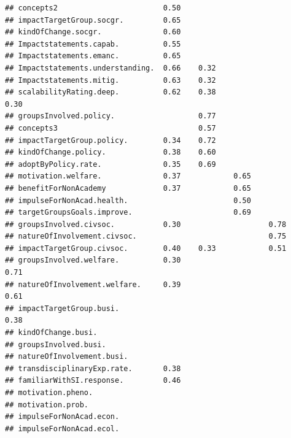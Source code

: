 \documentclass[
]{article}
\begin{document}
\begin{verbatim}
## concepts2                        0.50                                          
## impactTargetGroup.socgr.         0.65                                          
## kindOfChange.socgr.              0.60                                          
## Impactstatements.capab.          0.55                                          
## Impactstatements.emanc.          0.65                                          
## Impactstatements.understanding.  0.66    0.32                                  
## Impactstatements.mitig.          0.63    0.32                                  
## scalabilityRating.deep.          0.62    0.38                            0.30  
## groupsInvolved.policy.                   0.77                                  
## concepts3                                0.57                                  
## impactTargetGroup.policy.        0.34    0.72                                  
## kindOfChange.policy.             0.38    0.60                                  
## adoptByPolicy.rate.              0.35    0.69                                  
## motivation.welfare.              0.37            0.65                          
## benefitForNonAcademy             0.37            0.65                          
## impulseForNonAcad.health.                        0.50                          
## targetGroupsGoals.improve.                       0.69                          
## groupsInvolved.civsoc.           0.30                    0.78                  
## natureOfInvolvement.civsoc.                              0.75                  
## impactTargetGroup.civsoc.        0.40    0.33            0.51                  
## groupsInvolved.welfare.          0.30                            0.71          
## natureOfInvolvement.welfare.     0.39                            0.61          
## impactTargetGroup.busi.                                                  0.38  
## kindOfChange.busi.                                                             
## groupsInvolved.busi.                                                           
## natureOfInvolvement.busi.                                                      
## transdisciplinaryExp.rate.       0.38                                          
## familiarWithSI.response.         0.46                                          
## motivation.pheno.                                                              
## motivation.prob.                                                               
## impulseForNonAcad.econ.                                                        
## impulseForNonAcad.ecol.                                                        

\end{verbatim}
\end{document}
